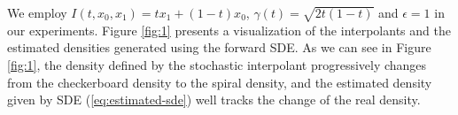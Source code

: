 We employ 
$I(t,x_0,x_1)=tx_1+(1-t)x_0$,
$\gamma(t)=\sqrt{2t(1-t)}$
and $\epsilon=1$ in our experiments.
Figure \ref{fig:1} presents a visualization of the interpolants and the estimated densities generated using the forward SDE. As we can see in Figure \ref{fig:1}, the density defined by the stochastic interpolant progressively changes from the checkerboard density to the spiral density, and the estimated density given by SDE (\ref{eq:estimated-sde}) well tracks the change of the real density. %




